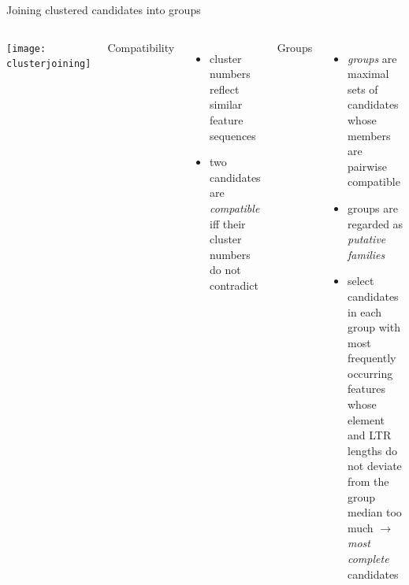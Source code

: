 \documentclass[final]{beamer}
\begin{document}
\begin{frame}[fragile]
\begin{columns}[t]
\begin{column}{.45\linewidth}
        \begin{block}{Joining clustered candidates into groups}
          \begin{columns}
              \centerline{\texttt{[image: clusterjoining]}}
              \alert{Compatibility}
              \begin{itemize}
                \item cluster numbers reflect similar feature sequences
                \item two candidates are \emph{compatible} iff their cluster
                      numbers do not contradict
              \end{itemize}
              \alert{Groups}
              \begin{itemize}
                \item \emph{groups} are maximal sets of candidates whose
                      members are pairwise compatible
                \item groups are regarded as \emph{putative families}
                \item select candidates in each group with most frequently
                      occurring features whose element and LTR lengths do not
                      deviate from the group median too much
                      $\to$ \emph{most complete} candidates
              \end{itemize}
          \end{columns}
        \end{block}


\end{column}
\end{columns}
\end{frame}
\end{document}

